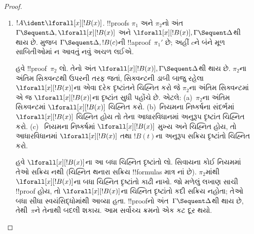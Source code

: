 \documentclass[../../../include/open-logic-section]{subfiles}
\begin{document}
\begin{proof}
\begin{enumerate}
  !!a{proof}~$\pi_2''$ મળે છે.
  $\pi_2''$ પર
  લગાવતાં $!C, !B, \Gamma \Sequent \Delta$ની
  !!a{proof}~$\pi_2'''$ પણ મળે છે.
  !!{proof}~$\pi'$ આ છે:
  \[
  \AxiomC{}
  \RightLabel{$\pi_2'$}
  \Deduce$\Gamma \fCenter \Delta, !B$
  \AxiomC{}
  \RightLabel{$\pi_1'$}
  \Deduce$!B, \Gamma \fCenter \Delta, !C$
  \AxiomC{}
  \RightLabel{$\pi_2'''$}
  \Deduce$!C, !B, \Gamma \fCenter \Delta$
  \RightLabel{\CutCS}
  \BinaryInf$!B, \Gamma \fCenter \Delta$
  \RightLabel{\CutCS}
  \BinaryInf$\Gamma \fCenter \Delta$
  \DisplayProof
  \]
  \item $!A \ident \lforall[x][!B(x)]$. !!{proof}s $\pi_1$ અને
  $\pi_2$નો અંત $\Gamma \Sequent \Delta, \lforall[x][!B(x)]$
  અને $\lforall[x][!B(x)], \Gamma \Sequent \Delta$થી થાય છે.
   મુજબ
  $\Gamma \Sequent \Delta, !B(c)$ની
  !!a{proof}~$\pi_1'$ છે; અહીં $c$ને બંને મૂળ
  સાબિતીઓમાં ન આવતું નવું અચળ લઈએ.

  હવે !!{proof}~$\pi_2$ લો. તેનો અંત
  $\lforall[x][!B(x)], \Gamma \Sequent \Delta$થી
  થાય છે. $\pi_2$ના અંતિમ સિક્વન્ટથી ઉપરની તરફ
  જતાં, સિક્વન્ટની ડાબી બાજુ રહેલા
  $\lforall[x][!B(x)]$ના એવા દરેક દૃષ્ટાંતને
  ચિહ્નિત કરો જે $\pi_2$ના અંતિમ સિક્વન્ટમાં
  એ જ $\lforall[x][!B(x)]$ના દૃષ્ટાંત સુધી પહોંચે છે. એટલે:
  (a)~$\pi_2$ના અંતિમ સિક્વન્ટમાં
  $\lforall[x][!B(x)]$ ચિહ્નિત કરો.
  (b)~નિયમના નિષ્કર્ષના સંદર્ભમાં
  $\lforall[x][!B(x)]$
  ચિહ્નિત હોય તો તેના આધારવિધાનમાં અનુરૂપ
  દૃષ્ટાંત ચિહ્નિત કરો. (c)~\LeftR{\lforall}
  નિયમના નિષ્કર્ષમાં $\lforall[x][!B(x)]$
  મુખ્ય અને ચિહ્નિત હોય, તો આધારવિધાનમાં
  $\lforall[x][!B(x)]$ તથા $!B(t)$ના
  અનુરૂપ સક્રિય દૃષ્ટાંતો ચિહ્નિત કરો.
  
  હવે $\lforall[x][!B(x)]$ના આ બધા
  ચિહ્નિત દૃષ્ટાંતો લો. \LeftR{\lforall}
  સિવાયના કોઈ નિયમમાં તેઓ સક્રિય નથી
  (ચિહ્નિત થનારા સક્રિય !!{formula}s
  માત્ર \LeftR{\lforall}નાં છે).
  $\pi_2$માંથી $\lforall[x][!B(x)]$ના
  બધા ચિહ્નિત દૃષ્ટાંતો કાઢી નાખો.
  જો મળેલું લખાણ સાચી !!{proof} હોય,
  તો $\lforall[x][!B(x)]$ના ચિહ્નિત
  દૃષ્ટાંતો કદી સક્રિય નહોતા;
  તેઓ બધા સીધા સ્વયંસિદ્ધોમાંથી આવ્યા હતા.
  !!{proof}નો અંત~$\Gamma \Sequent \Delta$થી
  થાય છે, તેથી~$\pi$ને તેનાથી બદલી શકાય.
  આમ સર્વોચ્ચ ક્રમનો એક કટ દૂર થયો.


\end{enumerate}
\end{proof}
\end{document}

